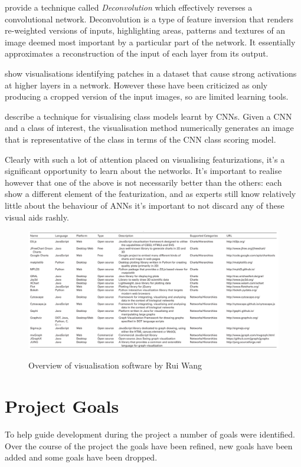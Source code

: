 \documentclass[a4paper,11pt,titlepage]{article}
\begin{document}
		\textbf{\cite{Zeiler2013}} provide a technique called \textit{Deconvolution} \cite{Zeiler2011} which effectively reverses a convolutional network. Deconvolution is a type of feature inversion that renders re-weighted versions of inputs, highlighting areas, patterns and textures of an image deemed most important by a particular part of the network. It essentially approximates a reconstruction of the input of each layer from its output.
		\par
		\textbf{\cite{Donahue2013}} show visualisations identifying patches in a dataset that cause strong activations at higher layers in a network. However these have been criticized as only producing a cropped version of the input images, so are limited learning tools. 
		\par 
		\textbf{\cite{Simonyan2013}} describe a technique for visualising class models learnt by CNNs. Given a CNN and a class of interest, the visualisation method numerically generates an image that is representative of the class in terms of the CNN class scoring model.
		\par 
		Clearly with such a lot of attention placed on visualising featurizations, it's a significant opportunity to learn about the networks. It's important to realise however that one of the above is not necessarily better than the others: each show a different element of the featurization, and as experts still know relatively little about the behaviour of ANNs it's important to not discard any of these visual aids rashly.
		
		\begin{figure}[H]
    			\centering	
		{{\includegraphics[width=18cm]
    				{img/rui_wang_vis_overview} 
    			}}%
    			\caption{Overview of visualisation software by Rui Wang}%
    		\label{fig:studentprofile}
		\end{figure}

\section{Project Goals}
	To help guide development during the project a number of goals were identified. Over the course of the project the goals have been refined, new goals have been added and some goals have been dropped.
\end{document}
